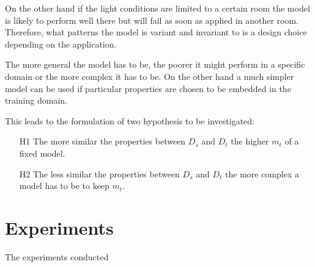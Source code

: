 On the other hand if the light conditions are limited to a certain room the model is likely to perform well there but will fail as soon as applied in another room. Therefore, what patterns the model is variant and invariant to is a design choice depending on the application.

The more general the model has to be, the poorer it might perform in a specific domain or the more complex it has to be. On the other hand a much simpler model can be used if particular properties are chosen to be embedded in the training domain. 

This leads to the formulation of two hypothesis to be investigated:

\begin{enumerate}
	\item[H1] The more similar the properties between $D_s$ and $D_t$ the higher $m_t$ of a fixed model.
	\item[H2] The less similar the properties between $D_s$ and $D_t$ the more complex a model has to be to keep $m_t$.
\end{enumerate}



\section{Experiments}
\label{sec:training:experiments}

The experiments conducted

